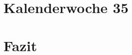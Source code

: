 \documentclass[11pt]{article} %
\begin{document}
\section{Kalenderwoche 35} \label{sec:kw35}
\section{Fazit} \label{sec:faz}

\newpage


\newpage

\end{document}
